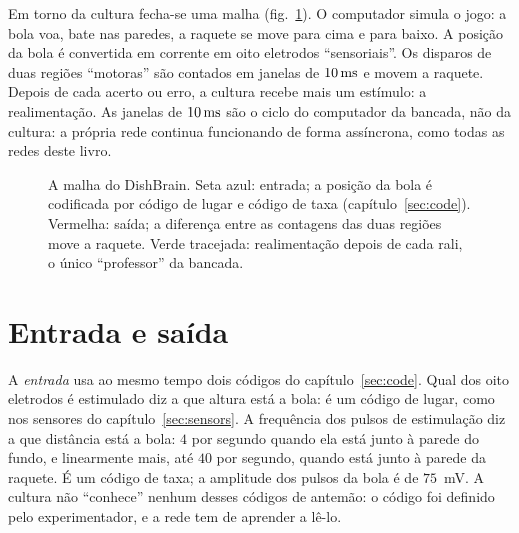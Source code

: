 Em torno da cultura fecha-se uma malha (fig.~\ref{fig:dishloop}). O computador simula o jogo: a bola voa, bate nas paredes, a raquete se move para cima e para baixo. A posição da bola é convertida em corrente em oito eletrodos ``sensoriais''. Os disparos de duas regiões ``motoras'' são contados em janelas de $10\,\text{ms}$ e movem a raquete. Depois de cada acerto ou erro, a cultura recebe mais um estímulo: a realimentação. As janelas de $10\,\text{ms}$ são o ciclo do computador da bancada, não da cultura: a própria rede continua funcionando de forma assíncrona, como todas as redes deste livro.

\begin{figure}[t]
\centering
{}
\caption{A malha do DishBrain. Seta azul: entrada; a posição da bola é codificada por código de lugar e código de taxa (capítulo~\ref{sec:code}). Vermelha: saída; a diferença entre as contagens das duas regiões move a raquete. Verde tracejada: realimentação depois de cada rali, o único ``professor'' da bancada.}
\label{fig:dishloop}
\end{figure}

\section{Entrada e saída}

A \emph{entrada} usa ao mesmo tempo dois códigos do capítulo~\ref{sec:code}. Qual dos oito eletrodos é estimulado diz a que altura está a bola: é um código de lugar, como nos sensores do capítulo~\ref{sec:sensors}. A frequência dos pulsos de estimulação diz a que distância está a bola: $4$ por segundo quando ela está junto à parede do fundo, e linearmente mais, até $40$ por segundo, quando está junto à parede da raquete. É um código de taxa; a amplitude dos pulsos da bola é de $75$~mV. A cultura não ``conhece'' nenhum desses códigos de antemão: o código foi definido pelo experimentador, e a rede tem de aprender a lê-lo.

